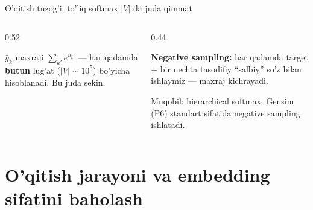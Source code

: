 \documentclass[aspectratio=169,11pt]{beamer}
\begin{document}
\begin{frame}{O'qitish tuzog'i: to'liq softmax $|V|$ da juda qimmat}
  \begin{columns}[T]
    \begin{column}{0.52\textwidth}
      \begin{tcolorbox}[warnbox,title=Maxraj butun lug'at bo'ylab]
        \small
        $\hat{y}_k$ maxraji $\sum_{k'} e^{u_{k'}}$ --- har qadamda
        \textbf{butun} lug'at ($|V|\sim 10^5$) bo'yicha hisoblanadi. Bu juda
        sekin.
      \end{tcolorbox}
    \end{column}
    \begin{column}{0.44\textwidth}
      \begin{tcolorbox}[okbox,title=Yechim,top=2pt,bottom=2pt]
        \small
        \textbf{Negative sampling:} har qadamda target $+$ bir nechta tasodifiy
        ``salbiy'' so'z bilan ishlaymiz --- maxraj kichrayadi.
      \end{tcolorbox}
      \vspace{3pt}
      \footnotesize\color{halfgray}
      Muqobil: hierarchical softmax. Gensim (P6) standart sifatida negative
      sampling ishlatadi.
    \end{column}
  \end{columns}
\end{frame}

\section[Baholash]{O'qitish jarayoni va embedding sifatini baholash}
\end{document}
